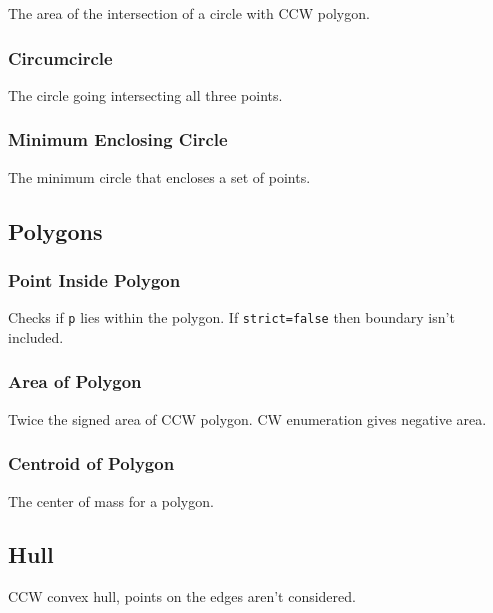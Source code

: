 The area of the intersection of a circle with CCW polygon.

\subsubsection{Circumcircle}

The circle going intersecting all three points.

\subsubsection{Minimum Enclosing Circle}

The minimum circle that encloses a set of points.

\subsection{Polygons}

\subsubsection{Point Inside Polygon}

Checks if \verb|p| lies within the polygon. If \verb|strict=false| then boundary isn't included.

\subsubsection{Area of Polygon}

Twice the signed area of CCW polygon. CW enumeration gives negative area.

\subsubsection{Centroid of Polygon}

The center of mass for a polygon.

\subsection{Hull}

CCW convex hull, points on the edges aren't considered.

